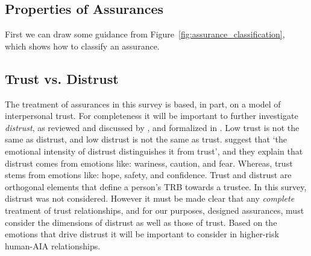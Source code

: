
\subsection{Properties of Assurances}
First we can draw some guidance from Figure~\ref{fig:assurance_classification}, which shows how to classify an assurance.





\subsection{Trust vs. Distrust}
The treatment of assurances in this survey is based, in part, on a model of interpersonal trust. For completeness it will be important to further investigate \textit{distrust}, as reviewed and discussed by \citet{Lewicki1998-ox}, and formalized in \citet{McKnight2001-gz}. Low trust is not the same as distrust, and low distrust is not the same as trust. \citet{McKnight2001-gz} suggest that `the emotional intensity of distrust distinguishes it from trust', and they explain that distrust comes from emotions like: wariness, caution, and fear. Whereas, trust stems from emotions like: hope, safety, and confidence. Trust and distrust are orthogonal elements that define a person's TRB towards a trustee. In this survey, distrust was not considered. However it must be made clear that any \emph{complete} treatment of trust relationships, and for our purposes, designed assurances, must consider the dimensions of distrust as well as those of trust. Based on the emotions that drive distrust it will be important to consider in higher-risk human-AIA relationships.



